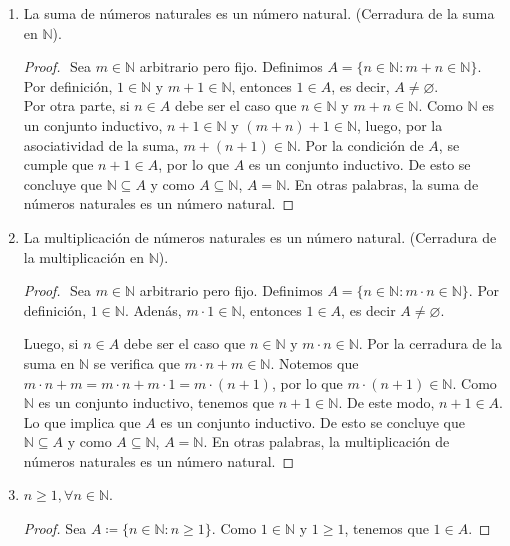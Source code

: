 \documentclass[11pt]{article}
\newcommand{\N}{\mathbb{N}}
\let\emptyset\varnothing
\begin{document}
\begin{enumerate}[label=\alph*)]
    \item La suma de números naturales es un número natural. (Cerradura de la suma en $\N$).
    \vspace{-1em}\begin{proof}$ $\newline
        Sea $m\in \N$ arbitrario pero fijo. Definimos $A=\{ n\in \N : m+n \in \N \}$. Por definición, $1\in \N$ y $m+1\in \N$, entonces $1\in A$, es decir, $A\neq \emptyset$. \\[5pt] Por otra parte, si $n\in A$ debe ser el caso que $n\in \N$ y $m+n\in \N$. Como $\N$ es un conjunto inductivo, $n+1 \in \N$ y $(m+n)+1 \in \N$, luego, por la asociatividad de la suma, $m+(n+1)\in \N$. Por la condición de $A$, se cumple que $n+1\in A$, por lo que $A$ es un conjunto inductivo. De esto se concluye que $\N\subseteq A$ y como $A\subseteq \N$, $A=\N$. En otras palabras, la suma de números naturales es un número natural.    
    \end{proof} \vspace{-1em}

    \item La multiplicación de números naturales es un número natural. (Cerradura de la multiplicación en $\N$).
    \vspace{-1em}\begin{proof}$ $\newline
        Sea $m\in \N$ arbitrario pero fijo. Definimos $A=\{n\in \N: m\cdot n \in \N\}$. Por definición, $1 \in \N$. Adenás, $m\cdot 1 \in \N$, entonces $1 \in A$, es decir $A \neq \emptyset$.
    
        Luego, si $n \in A$ debe ser el caso que $n\in \N$ y $m \cdot n \in \N$. Por la cerradura de la suma en $\N$ se verifica que $m\cdot n + m \in \N$. Notemos que $m\cdot n + m=m\cdot n + m\cdot 1 = m\cdot (n+1)$, por lo que $m \cdot (n+1) \in \N$. Como $\N$ es un conjunto inductivo, tenemos que $n+1\in \N$. De este modo, $n+1\in A$. Lo que implica que $A$ es un conjunto inductivo. De esto se concluye que $\N \subseteq A$ y como $A\subseteq \N$, $A=\N$. En otras palabras, la multiplicación de números naturales es un número natural.
    \end{proof} \vspace{-1em}

    \item $n\geq 1, \forall n\in \N$.
    \vspace{-1em}\begin{proof} 
        Sea $A\coloneqq \{n\in \N: n\geq 1\}$. Como $1\in \N$ y $1\geq 1$, tenemos que $1\in A$.


\end{proof}
\end{enumerate}
\end{document}
